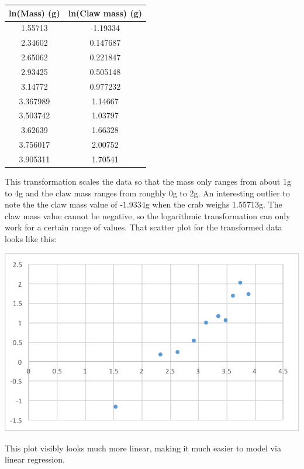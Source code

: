 \documentclass[10pt,letterpaper]{article}
\begin{document}
			\begin{center}
				\begin{tabular}{c c}
					ln(Mass) (g) & ln(Claw mass) (g)\\
					\hline
					1.55713 & -1.19334 \\
					2.34602 & 0.147687 \\
					2.65062 & 0.221847 \\
					2.93425 & 0.505148 \\
					3.14772 & 0.977232 \\
					3.367989 & 1.14667 \\
					3.503742 & 1.03797 \\
					3.62639 & 1.66328 \\
					3.756017 & 2.00752 \\
					3.905311 & 1.70541
				\end{tabular}
			\end{center}
			This transformation scales the data so that the mass only ranges from about 1g to 4g and the claw mass ranges from roughly 0g to 2g. An interesting outlier to note the the claw mass value of -1.9334g when the crab weighs 1.55713g. The claw mass value cannot be negative, so the logarithmic transformation can only work for a certain range of values. That scatter plot for the transformed data looks like this:
			\newline \newline
			\centerline{\includegraphics{Picture2.pdf}}
			\newline \newline
			This plot visibly looks much more linear, making it much easier to model via linear regression. 
\end{document}
